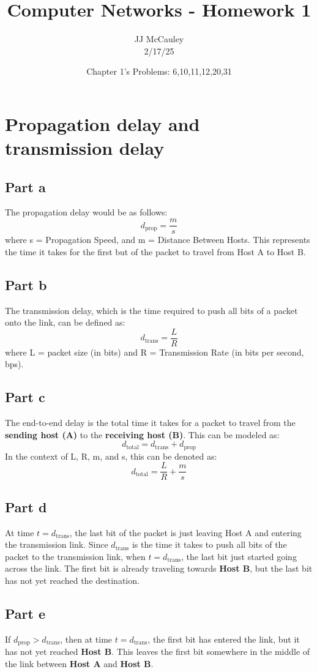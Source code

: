 \documentclass{article}
\title{Computer Networks - Homework 1}
\author{JJ McCauley \\ 2/17/25}
\date{Chapter 1's Problems: 6,10,11,12,20,31}
\begin{document}
\maketitle


\setcounter{section}{5}
\section{Propagation delay and transmission delay}
\subsection{Part a}
The propagation delay would be as follows:
\[
d_{\text{prop}} = \frac{m}{s}
\]
where s = Propagation Speed, and m = Distance  Between Hosts. This represents the time it takes for the first but of the packet to travel from Host A to Host B.
\subsection{Part b}
The transmission delay, which is the time required to push all bits of a packet onto the link, can be defined as:
\[
d_{\text{trans}} = \frac{L}{R}
\]
where L = packet size (in bits) and R = Transmission Rate (in bits per second, bps).
\subsection{Part c}
The end-to-end delay is the total time it takes for a packet to travel from the \textbf{sending host (A)} to the \textbf{receiving host (B)}. This can be modeled as:
\[
d_{\text{total}} = d_{\text{trans}} + d_{\text{prop}}
\]
In the context of L, R, m, and s, this can be denoted as:
\[
d_{\text{total}} = \frac{L}{R} + \frac{m}{s}
\]
\subsection{Part d}
At time $t = d_{\text{trans}}$, the last bit of the packet is just leaving Host A and entering the transmission link. Since $d_{\text{trans}}$ is the time it takes to push all bits of the packet to the transmission link, when $t = d_{\text{trans}}$, the last bit just started going across the link. The first bit is already traveling towards \textbf{Host B}, but the last bit has not yet reached the destination.
\subsection{Part e}
If $d_{\text{prop}} > d_{\text{trans}}$, then at time $t = d_{\text{trans}}$, the first bit has entered the link, but it has not yet reached \textbf{Host B}. This leaves the first bit somewhere in the middle of the link between \textbf{Host A} and \textbf{Host B}.
\end{document}
